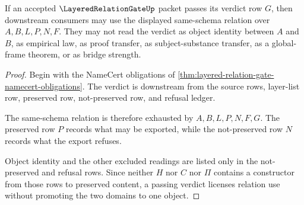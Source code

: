 \begin{theorem}
\label{thm:layered-relation-gate-same-schema-nonidentity}
If an accepted $\LayeredRelationGateUp$ packet passes its verdict row $G$, then downstream consumers may use the displayed same-schema relation over $A,B,L,P,N,F$. They may not read the verdict as object identity between $A$ and $B$, as empirical law, as proof transfer, as subject-substance transfer, as a global-frame theorem, or as bridge strength.
\end{theorem}
\begin{proof}
Begin with the NameCert obligations of \autoref{thm:layered-relation-gate-namecert-obligations}. The verdict is downstream from the source rows, layer-list row, preserved row, not-preserved row, and refusal ledger.

The same-schema relation is therefore exhausted by $A,B,L,P,N,F,G$. The preserved row $P$ records what may be exported, while the not-preserved row $N$ records what the export refuses.

Object identity and the other excluded readings are listed only in the not-preserved and refusal rows. Since neither $H$ nor $C$ nor $\Pi$ contains a constructor from those rows to preserved content, a passing verdict licenses relation use without promoting the two domains to one object.
\end{proof}

